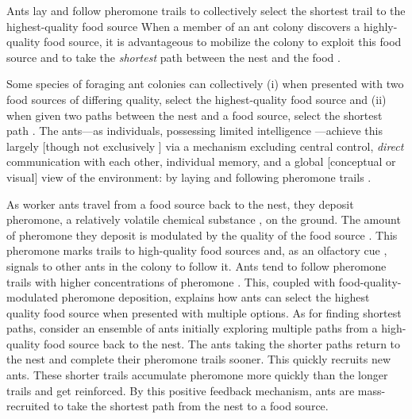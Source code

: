 \documentclass[11pt, oneside]{article}
\begin{document}
\begin{mybox}[label=box:qcmzifs, breakable]{Ants lay and follow pheromone trails to collectively select the shortest trail to the highest-quality food source}
When a member of an ant colony discovers a highly-quality food source, it is advantageous to mobilize the colony to exploit this food source \cite{deneubourg1983probabilistic} and to take the \emph{shortest} path between the nest and the food \cite{goss1989self}.

Some species of foraging ant colonies can collectively 
(i) when presented with two food sources of differing quality, select the highest-quality food source \cite{beckers1993modulation} and
(ii) when given two paths between the nest and a food source, select the shortest path \cite{goss1989self}.
The ants---as individuals, possessing limited intelligence \cite{edelstein1995trail}---achieve this largely [though not exclusively \cite{evison2008combined,czaczkes2015trail,robinson2005no}] via a mechanism excluding central control, \emph{direct} communication with each other, individual memory, and a global [conceptual or visual] view of the environment: by laying and following pheromone trails \cite{czaczkes2015trail}.

As worker ants travel from a food source back to the nest, they deposit pheromone, a relatively volatile chemical substance \cite{david2009trail}, on the ground. 
The amount of pheromone they deposit is modulated by the quality of the food source \cite{beckers1993modulation}. 
This pheromone marks trails to high-quality food sources and, as an olfactory cue \cite{knaden2016sensory}, signals to other ants in the colony to follow it. \cite{david2009trail,deneubourg1990self}
Ants tend to follow pheromone trails with higher concentrations of pheromone \cite{beckers1993modulation,czaczkes2015trail}.
This, coupled with food-quality-modulated pheromone deposition, explains how ants can select the highest quality food source when presented with multiple options. 
As for finding shortest paths, consider an ensemble of ants initially exploring multiple paths from a high-quality food source back to the nest.
The ants taking the shorter paths return to the nest and complete their pheromone trails sooner. This quickly recruits new ants. These shorter trails accumulate pheromone more quickly than the longer trails and get reinforced. By this positive feedback mechanism, ants are mass-recruited to take the shortest path from the nest to a food source. \cite{jackson2006communication,czaczkes2015trail,bonabeau1999swarm}


\end{mybox}
\end{document}
